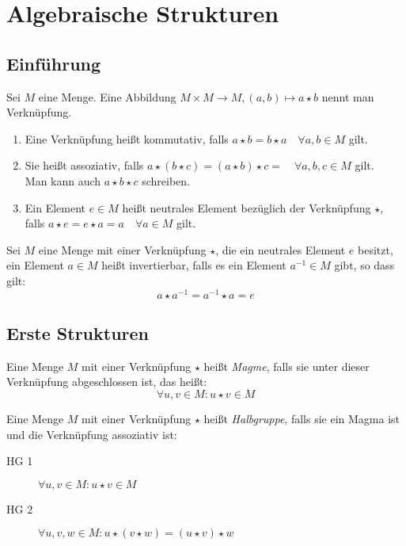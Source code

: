 \chapter{Algebraische Strukturen}

\section{Einführung}
Sei $M$ eine Menge. Eine Abbildung $M\times M \rightarrow M, (a,b)\mapsto a\star b$ nennt man Verknüpfung.

\begin{enumerate}
  \item Eine Verknüpfung heißt kommutativ, falls $a\star b = b\star a \quad\forall a,b\in M$ gilt.
  \item Sie heißt assoziativ, falls $a\star(b\star c)=(a\star b)\star c = \quad\forall a,b,c\in M$ gilt.\\
  Man kann auch $a\star b\star c$ schreiben.
  \item Ein Element $e\in M$ heißt neutrales Element bezüglich der Verknüpfung $\star$,\\
  falls $a\star e = e\star a=a \quad\forall a\in M$ gilt.
\end{enumerate}

Sei $M$ eine Menge mit einer Verknüpfung $\star$, die ein neutrales Element $e$ besitzt, ein Element $a\in M$ heißt invertierbar, falls es ein Element $a^{-1}\in M$ gibt, so dass gilt:
\begin{equation*}
  a\star a^{-1} = a^{-1} \star a = e
\end{equation*}

\section{Erste Strukturen}
Eine Menge $M$ mit einer Verknüpfung $\star$ heißt \emph{Magme}, falls sie unter dieser Verknüpfung abgeschlossen ist, das heißt:
\begin{equation*}
  \forall u,v \in M: u\star v\in M
\end{equation*}

Eine Menge $M$ mit einer Verknüpfung $\star$ heißt \emph{Halbgruppe}, falls sie ein Magma ist und die Verknüpfung assoziativ ist:
\begin{description}
  \item[HG 1] $\forall u,v \in M: u\star v\in M$
  \item[HG 2] $\forall u,v,w \in M: u\star(v\star w)=(u\star v)\star w$
\end{description}

